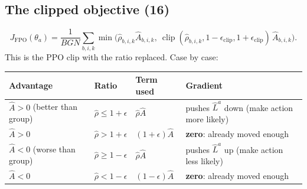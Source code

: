 \documentclass[11pt,a4paper]{article}
\newcommand{\tha}{\theta_a}
\newcommand{\Lh}{\hat L^{a}}
\newcommand{\Ah}{\hat A}
\newcommand{\clip}{\operatorname{clip}}
\newcommand{\eqp}[1]{\textup{(#1)}} %
\theoremstyle{remark}
\begin{document}
\subsection{The clipped objective \eqp{16}}
\begin{equation}
J_{\mathrm{FPO}}(\tha)=\frac1{BGN}\sum_{b,i,k}\min\Big(\hat\rho_{b,i,k}\Ah_{b,i,k},\ \clip(\hat\rho_{b,i,k},1-\epsilon_{\mathrm{clip}},1+\epsilon_{\mathrm{clip}})\,\Ah_{b,i,k}\Big).
\label{eq:fpo}
\end{equation}
This is the PPO clip with the ratio replaced. Case by case:
\begin{center}
\small
\begin{tabular}{@{}llll@{}}
\toprule
Advantage & Ratio & Term used & Gradient\\
\midrule
$\Ah>0$ (better than group) & $\hat\rho\le1+\epsilon$ & $\hat\rho\Ah$ & pushes $\Lh$ down (make action more likely)\\
$\Ah>0$ & $\hat\rho>1+\epsilon$ & $(1+\epsilon)\Ah$ & \textbf{zero}: already moved enough\\
$\Ah<0$ (worse than group) & $\hat\rho\ge1-\epsilon$ & $\hat\rho\Ah$ & pushes $\Lh$ up (make action less likely)\\
$\Ah<0$ & $\hat\rho<1-\epsilon$ & $(1-\epsilon)\Ah$ & \textbf{zero}: already moved enough\\
\bottomrule
\end{tabular}
\end{center}
\end{document}
